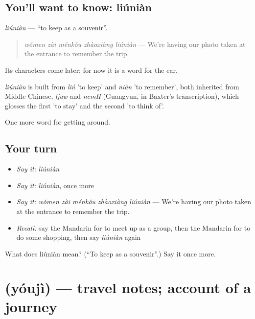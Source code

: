 \subsection*{You'll want to know: liúniàn}
\emph{liúniàn} — \textquotedblleft{}to keep as a souvenir\textquotedblright{}.

\begin{quote}
\emph{wǒmen zài ménkǒu zhàoxiàng liúniàn} — We're having our photo taken at the entrance to remember the trip.
\end{quote}

Its characters come later; for now it is a word for the ear.

\begin{cousinweb}
\emph{liúniàn} is built from \emph{liú} 'to keep' and \emph{niàn} 'to remember', both inherited from Middle Chinese, \emph{ljuw} and \emph{nemH} (Guangyun, in Baxter's transcription), which glosses the first 'to stay' and the second 'to think of'.
\end{cousinweb}

\begin{grammarlens}[title={What you've built}]
One more word for getting around.
\end{grammarlens}

\subsection*{Your turn}
\begin{itemize}
\raggedright
  \item \emph{Say it:} \emph{liúniàn}
  \item \emph{Say it:} \emph{liúniàn}, once more
  \item \emph{Say it:} \emph{wǒmen zài ménkǒu zhàoxiàng liúniàn} — We're having our photo taken at the entrance to remember the trip.
  \item \emph{Recall:} say the Mandarin for to meet up as a group, then the Mandarin for to do some shopping, then say \emph{liúniàn} again
\end{itemize}

\begin{tcolorbox}[breakable,colback=teal!4,colframe=teal!35!black,title={Before you move on}]
What does liúniàn mean? (\textquotedblleft{}To keep as a souvenir\textquotedblright{}.) Say it once more.
\end{tcolorbox}
\section[\texorpdfstring{\zh{游记} (yóujì)}{游记 (yóujì)}]{ (yóujì) — travel notes; account of a journey}

